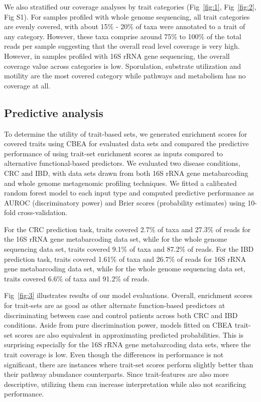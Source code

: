 \documentclass{bmcart}
\begin{document}
We also stratified our coverage analyses by trait categories (Fig~\ref{fig:1}, Fig~\ref{fig:2}, Fig S1). For samples profiled with whole genome sequencing, all trait categories are evenly covered, with about 15\% - 20\% of taxa were annotated to a trait of any category. However, these taxa comprise around 75\% to 100\% of the total reads per sample suggesting that the overall read level coverage is very high. However, in samples profiled with 16S rRNA gene sequencing, the overall coverage value across categories is low. Sporulation, substrate utilization and motility are the most covered category while pathways and metabolism has no coverage at all.    

\subsection*{Predictive analysis} 
To determine the utility of trait-based sets, we generated enrichment scores for covered traits using CBEA \cite{nguyen2022cbea} for evaluated data sets and compared the predictive performance of using trait-set enrichment scores as inputs compared to alternative functional-based predictors. We evaluated two disease conditions, CRC and IBD, with data sets drawn from both 16S rRNA gene metabarcoding and whole genome metagenomic profiling techniques. We fitted a calibrated random forest model to each input type and computed predictive performance as AUROC (discriminatory power) and Brier scores (probability estimates) using 10-fold cross-validation.  

For the CRC prediction task, traits covered 2.7\% of taxa and 27.3\% of reads for the 16S rRNA gene metabarcoding data set, while for the whole genome sequencing data set, traits covered 9.1\% of taxa and 87.2\% of reads. For the IBD prediction task, traits covered 1.61\% of taxa and 26.7\% of reads for 16S rRNA gene metabarcoding data set, while for the whole genome sequencing data set, traits covered 6.6\% of taxa and 91.2\% of reads.  

Fig~\ref{fig:3} illustrates results of our model evaluations. Overall, enrichment scores for trait-sets are as good as other alternate function-based predictors at discriminating between case and control patients across both CRC and IBD conditions. Aside from pure discrimination power, models fitted on CBEA trait-set scores are also equivalent in approximating predicted probabilities. This is surprising especially for the 16S rRNA gene metabarcoding data sets, where the trait coverage is low. Even though the differences in performance is not significant, there are instances where trait-set scores perform slightly better than their pathway abundance counterparts. Since trait-features are also more descriptive, utilizing them can increase interpretation while also not scarificing performance.   
\end{document}
